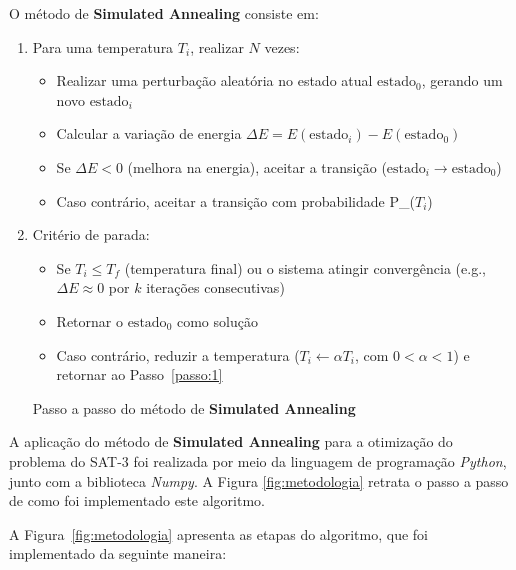 \documentclass[12pt]{article}
\begin{document}
O método de \textbf{Simulated Annealing} consiste em:
\begin{enumerate}
  
  \item Para uma temperatura $T_i$, realizar $N$ vezes: \label{passo:1}
  \begin{itemize}
    \item Realizar uma perturbação aleatória no estado atual $\text{estado}_0$, gerando um novo $\text{estado}_i$
    \item Calcular a variação de energia $\Delta E = E(\text{estado}_i) - E(\text{estado}_0)$
    \item Se $\Delta E < 0$ (melhora na energia), aceitar a transição ($\text{estado}_i \rightarrow \text{estado}_0$)
    \item Caso contrário, aceitar a transição com probabilidade P_{}($T_i$)
  \end{itemize}
  
  \item Critério de parada:
  \begin{itemize} \label{passo:2}
    \item Se $T_i \leq T_f$ (temperatura final) ou o sistema atingir convergência (e.g., $\Delta E \approx 0$ por $k$ iterações consecutivas)
    \item Retornar o $\text{estado}_0$ como solução
    \item Caso contrário, reduzir a temperatura ($T_i \leftarrow \alpha T_i$, com $0 < \alpha < 1$) e retornar ao Passo~\ref{passo:1}
  \end{itemize}
  \label{pseudocodigo}
  \caption{Passo a passo do método de \textbf{Simulated Annealing}}
\end{enumerate} 

A aplicação do método de \textbf{Simulated Annealing} para a otimização do problema do SAT-3 foi realizada por meio da linguagem de programação \textit{Python}, junto com a biblioteca \textit{Numpy}.
%
A Figura \ref{fig:metodologia} retrata o passo a passo de como foi implementado este algoritmo.

A Figura~\ref{fig:metodologia} apresenta as etapas do algoritmo, que foi implementado da seguinte maneira:
\end{document}
